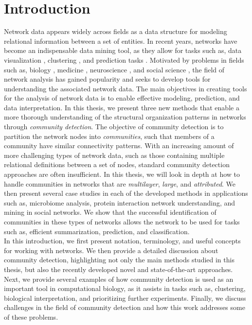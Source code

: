 





% 

\chapter{Introduction}
Network data appears widely across fields as a data structure for modeling relational information between a set of entities.  In recent years, networks have become an indispensable data mining tool, as they allow for tasks such as, data visualization \cite{traud}, clustering \cite{fortu2}, and prediction tasks \cite{linkPredReview,collabComm}.  Motivated by problems in fields such as, biology \cite{larremoreparasite}, medicine \cite{immuneClock}, neuroscience \cite{Neuro}, and social science \cite{socialnetwork}, the field of network analysis has gained popularity and seeks to develop tools for understanding the associated network data. The main objectives in creating tools for the analysis of network data is to enable effective modeling, prediction, and data interpretation. In this thesis, we present three new methods that enable a more thorough understanding of the structural organization patterns in networks through \emph{community detection}. The objective of community detection is to partition the network nodes into \emph{communities}, such that members of a community have similar connectivity patterns. With an increasing amount of more challenging types of network data, such as those containing multiple relational definitions between a set of nodes, standard community detection approaches are often insufficient. In this thesis, we will look in depth at how to handle communities in networks that are \emph{multilayer}, \emph{large}, and \emph{attributed}. We then present several case studies in each of the developed methods in applications such as, microbiome analysis, protein interaction network understanding, and mining in social networks. We show that the successful identification of communities in these types of networks allows the network to be used for tasks such as, efficient summarization, prediction, and classification. \\
\indent In this introduction, we first present notation, terminology, and useful concepts for working with networks. We then provide a detailed discussion about community detection, highlighting not only the main methods studied in this thesis, but also the recently developed novel and state-of-the-art approaches. Next, we provide several examples of how community detection is used as an important tool in computational biology, as it assists in tasks such as, clustering, biological interpretation, and prioritizing further experiments. Finally, we discuss challenges in the field of community detection and how this work addresses some of these problems. 

